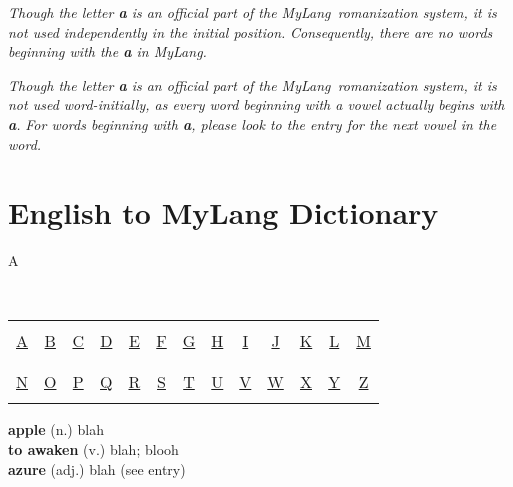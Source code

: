 \documentclass[oneside]{book}
\newcommand{\LanguageName}{MyLang}
\begin{document}
\emph{Though the letter \textbf{a} is an official part of the \LanguageName\ romanization system, it is not used independently in the initial position.}
\emph{Consequently, there are no words beginning with the \textbf{a} in \LanguageName.}

\emph{Though the letter \textbf{a} is an official part of the \LanguageName\ romanization system, it is not used word-initially, as every word beginning with a vowel actually begins with \textbf{a}.}
\emph{For words beginning with \textbf{a}, please look to the entry for the next vowel in the word.}

\chapter{English to MyLang Dictionary}

\begin{center}
\Huge
\hypertarget{ENUA}{A}

\Large
{\ }

\normalsize
\begin{tabular}{*{13}{|c}|}\hline
&&&&&&&&&&&&\\
\hyperlink{ENUA}{\Large A}&
\hyperlink{ENUA}{\Large B}&
\hyperlink{ENUA}{\Large C}&
\hyperlink{ENUA}{\Large D}&
\hyperlink{ENUA}{\Large E}&
\hyperlink{ENUA}{\Large F}&
\hyperlink{ENUA}{\Large G}&
\hyperlink{ENUA}{\Large H}&
\hyperlink{ENUA}{\Large I}&
\hyperlink{ENUA}{\Large J}&
\hyperlink{ENUA}{\Large K}&
\hyperlink{ENUA}{\Large L}&
\hyperlink{ENUA}{\Large M}\\
&&&&&&&&&&&&\\\hline&&&&&&&&&&&&\\
\hyperlink{ENUA}{\Large N}&
\hyperlink{ENUA}{\Large O}&
\hyperlink{ENUA}{\Large P}&
\hyperlink{ENUA}{\Large Q}&
\hyperlink{ENUA}{\Large R}&
\hyperlink{ENUA}{\Large S}&
\hyperlink{ENUA}{\Large T}&
\hyperlink{ENUA}{\Large U}&
\hyperlink{ENUA}{\Large V}&
\hyperlink{ENUA}{\Large W}&
\hyperlink{ENUA}{\Large X}&
\hyperlink{ENUA}{\Large Y}&
\hyperlink{ENUA}{\Large Z}\\
&&&&&&&&&&&&\\\hline
\end{tabular}
\end{center}

{
\setlength{\parindent}{0cm}
\textbf{apple} (n.) blah\\
\textbf{to awaken} (v.) blah; blooh\\
\textbf{azure} (adj.) blah (see entry)\\
}
\end{document}
